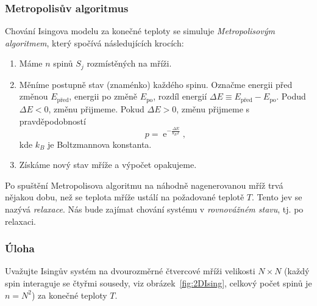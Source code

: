 \documentclass[a4paper,11pt,twoside]{article}
\DeclareMathOperator{\e}{e}
\begin{document}
\subsubsection*{Metropolisův algoritmus}
Chování Isingova modelu za konečné teploty se simuluje \emph{Metropolisovým algoritmem}, který spočívá následujících krocích:
\begin{enumerate}
	\item Máme $n$ spinů $S_{j}$ rozmístěných na mříži.
	\item Měníme postupně stav (znaménko) každého spinu.
		Označme energii před změnou $E_{\mathrm{před}}$, energii po změně $E_{\mathrm{po}}$, rozdíl energií $\Delta E\equiv E_{\mathrm{před}}-E_{\mathrm{po}}$.
		Podud $\Delta E<0$, změnu přijmeme.
		Pokud $\Delta E>0$, změnu přijmeme s pravděpodobností
		\begin{equation}
			p=\e^{-\frac{\Delta E}{k_{B} T}},
		\end{equation}
		kde $k_{B}$ je Boltzmannova konstanta.
	\item Získáme nový stav mříže a výpočet opakujeme.
\end{enumerate}

Po spuštění Metropolisova algoritmu na náhodně nagenerovanou mříž trvá nějakou dobu, než se teplota mříže ustálí na požadované teplotě $T$.
Tento jev se nazývá \emph{relaxace}.
Nás bude zajímat chování systému v \emph{rovnovážném stavu}, tj. po relaxaci.

\subsubsection*{Úloha}
Uvažujte Isingův systém na dvourozměrné čtvercové mříži velikosti $N\times N$ (každý spin interaguje se čtyřmi sousedy, viz obrázek~\ref{fig:2DIsing}, celkový počet spinů je $n=N^2$) za konečné teploty $T$.
\end{document}
